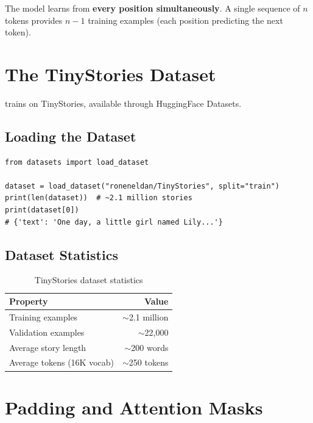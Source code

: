 \begin{keypoint}
The model learns from \textbf{every position simultaneously}. A single sequence of $n$ tokens provides $n-1$ training examples (each position predicting the next token).
\end{keypoint}

\section{The TinyStories Dataset}

\TryLM trains on TinyStories, available through HuggingFace Datasets.

\subsection{Loading the Dataset}

\begin{lstlisting}[style=python]
from datasets import load_dataset

dataset = load_dataset("roneneldan/TinyStories", split="train")
print(len(dataset))  # ~2.1 million stories
print(dataset[0])
# {'text': 'One day, a little girl named Lily...'}
\end{lstlisting}

\subsection{Dataset Statistics}

\begin{table}[H]
\centering
\begin{tabular}{lr}
\toprule
\textbf{Property} & \textbf{Value} \\
\midrule
Training examples & $\sim$2.1 million \\
Validation examples & $\sim$22,000 \\
Average story length & $\sim$200 words \\
Average tokens (16K vocab) & $\sim$250 tokens \\
\bottomrule
\end{tabular}
\caption{TinyStories dataset statistics}
\end{table}

\section{Padding and Attention Masks}

